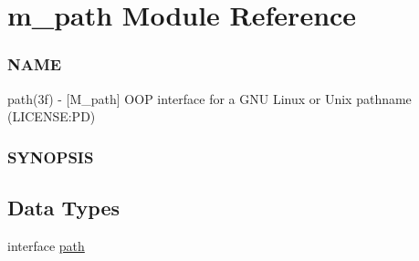 \hypertarget{namespacem__path}{}\section{m\+\_\+path Module Reference}
\label{namespacem__path}


\subsubsection*{N\+A\+ME}

path(3f) -\/ \mbox{[}M\+\_\+path\mbox{]} O\+OP interface for a G\+NU Linux or Unix pathname (L\+I\+C\+E\+N\+SE\+:PD) \subsubsection*{S\+Y\+N\+O\+P\+S\+IS} 


\subsection*{Data Types}
\begin{DoxyCompactItemize}
\item 
interface \mbox{\hyperlink{structm__path_1_1path}{path}}
\end{DoxyCompactItemize}
